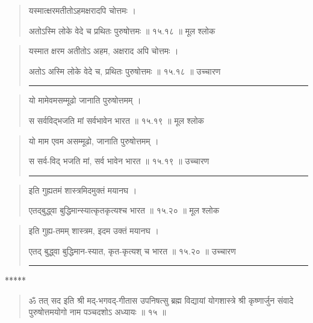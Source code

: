 \begin{quotation}

यस्मात्क्षरमतीतोऽहमक्षरादपि चोत्तमः  ।  

अतोऽस्मि लोके वेदे च प्रथितः पुरुषोत्तमः  ॥ १५.१८ ॥  मूल श्लोक
\end{quotation}

\begin{quotation}

यस्मात क्षरम अतीतोऽ अहम, अक्षराद अपि चोत्तमः  ।  

अतोऽ अस्मि लोके वेदे च, प्रथितः पुरुषोत्तमः  ॥ १५.१८ ॥  उच्चारण

\noindent\rule{16cm}{0.4pt} 
\end{quotation}


\begin{quotation}

यो मामेवमसम्मूढो जानाति पुरुषोत्तमम्‌  ।  

स सर्वविद्भजति मां सर्वभावेन भारत  ॥ १५.१९ ॥  मूल श्लोक
\end{quotation}

\begin{quotation}

यो माम एवम असम्मूढो, जानाति पुरुषोत्तमम्‌  ।  

स सर्व-विद् भजति मां, सर्व भावेन भारत  ॥ १५.१९ ॥  उच्चारण

\noindent\rule{16cm}{0.4pt} 
\end{quotation}


\begin{quotation}

इति गुह्यतमं शास्त्रमिदमुक्तं मयानघ  ।  

एतद्‍बुद्ध्वा बुद्धिमान्स्यात्कृतकृत्यश्च भारत  ॥ १५.२० ॥  मूल श्लोक
\end{quotation}

\begin{quotation}

इति गुह्य-तमम् शास्त्रम, इदम उक्तं मयानघ  ।  

एतद्‍ बुद्ध्वा बुद्धिमान-स्यात, कृत-कृत्यश् च भारत  ॥ १५.२० ॥  उच्चारण

\noindent\rule{16cm}{0.4pt} 
\end{quotation}
\begin{center} ***** \end{center}


\begin{quotation}


ॐ तत् सद इति श्री मद्-भगवद्-गीतास उपनिषत्सु ब्रह्म विद्यायां योगशास्त्रे श्री कृष्णार्जुन संवादे  पुरुषोत्तमयोगो नाम पञ्चदशोऽ अध्यायः  ॥  १५  ॥ 
\end{quotation} 